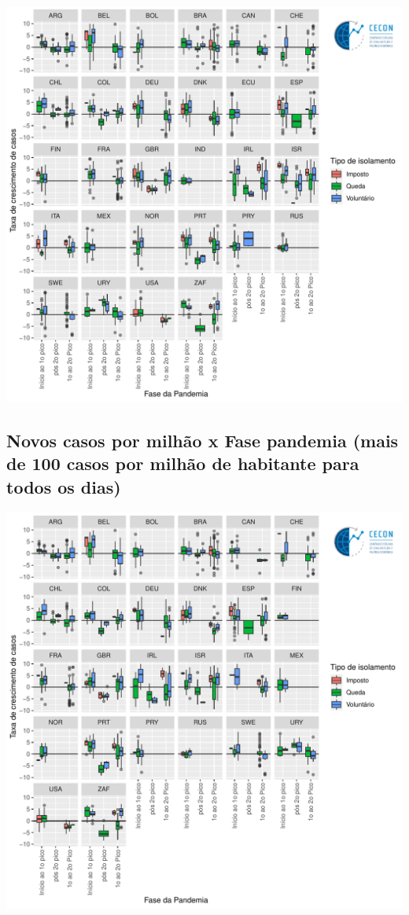 \documentclass{SelfArx}
\begin{document}
\begin{center}
\includegraphics[width=.9\linewidth]{./figs/COVID/Casos_Policy_50_Todos.pdf}
\end{center}

\subsection*{Novos casos por milhão x Fase pandemia (mais de 100 casos por milhão de habitante para todos os dias)}
\label{sec:org6d2905c}

\begin{center}
\includegraphics[width=.9\linewidth]{./figs/COVID/Casos_Policy_100_Todos.pdf}
\end{center}
\end{document}
